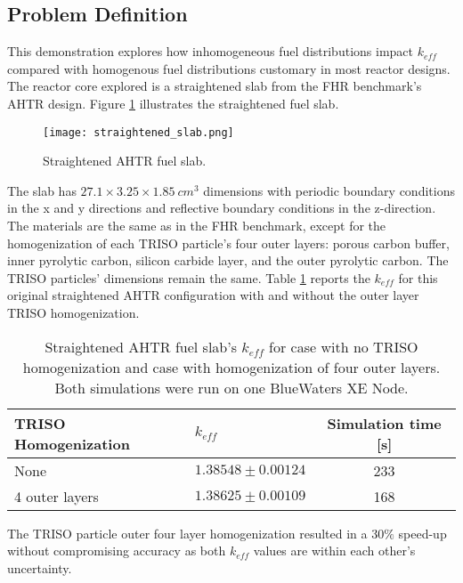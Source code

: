 \subsection{Problem Definition}
This demonstration explores how inhomogeneous fuel distributions impact $k_{eff}$ 
compared with homogenous fuel distributions customary in most reactor designs. 
The reactor core explored is a straightened slab from the \gls{FHR} benchmark's
\gls{AHTR} design.
Figure \ref{fig:straightened_slab} illustrates the straightened fuel slab. 
\begin{figure}[]
    \centering
    \texttt{[image: straightened\_slab.png]}
    \raggedright
    \caption{Straightened \acrfull{AHTR} fuel slab.}
    \label{fig:straightened_slab}
\end{figure}
The slab has $27.1 \times 3.25 \times 1.85\ cm^3$ dimensions
with periodic boundary conditions in the x and y directions and reflective 
boundary conditions in the z-direction. 
The materials are the same as in the \gls{FHR} benchmark, except for 
the homogenization of each \gls{TRISO} particle's four outer layers: 
porous carbon buffer, inner pyrolytic carbon, silicon carbide layer, and the 
outer pyrolytic carbon. 
The \gls{TRISO} particles' dimensions remain the same.
Table \ref{tab:keff_triso} reports the $k_{eff}$ for this original straightened 
\gls{AHTR} configuration with and without the outer layer \gls{TRISO} 
homogenization.
\begin{table}[]
    \centering
    \onehalfspacing
    \caption{Straightened \acrfull{AHTR} fuel slab's $k_{eff}$ for case with 
    no \gls{TRISO} homogenization and case with homogenization of four outer 
    layers. Both simulations were run on one BlueWaters XE Node.}
	\label{tab:keff_triso}
    \footnotesize
    \begin{tabular}{llc}
    \hline 
    \textbf{TRISO Homogenization}& \textbf{$k_{eff}$} & \textbf{Simulation time [s]}  \\
    \hline 
    None & $1.38548 \pm 0.00124$ & 233\\ 
    4 outer layers & $1.38625 \pm 0.00109$ & 168\\ 
    \hline
    \end{tabular}
\end{table}
The \gls{TRISO} particle outer four layer homogenization resulted in a $30\%$ 
speed-up without compromising accuracy as both $k_{eff}$ values are within 
each other's uncertainty.

